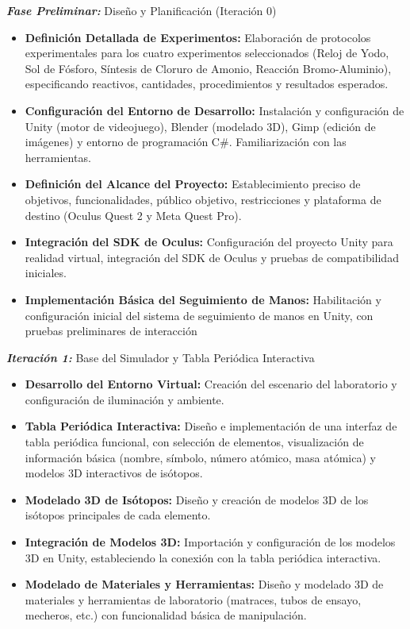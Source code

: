 \textit{\textbf{Fase Preliminar:}} Diseño y Planificación (Iteración 0)
\begin{itemize}
    \item \textbf{Definición Detallada de Experimentos:} Elaboración de protocolos experimentales para los cuatro experimentos seleccionados (Reloj de Yodo, Sol de Fósforo, Síntesis de Cloruro de Amonio, Reacción Bromo-Aluminio), especificando reactivos, cantidades, procedimientos y resultados esperados.
    \item \textbf{Configuración del Entorno de Desarrollo:} Instalación y configuración de Unity (motor de videojuego), Blender (modelado 3D), Gimp (edición de imágenes) y entorno de programación C\#. Familiarización con las herramientas.
    \item \textbf{Definición del Alcance del Proyecto:} Establecimiento preciso de objetivos, funcionalidades, público objetivo, restricciones y plataforma de destino (Oculus Quest 2 y Meta Quest Pro).
    \item \textbf{Integración del SDK de Oculus:} Configuración del proyecto Unity para realidad virtual, integración del SDK de Oculus y pruebas de compatibilidad iniciales.
    \item \textbf{Implementación Básica del Seguimiento de Manos:} Habilitación y configuración inicial del sistema de seguimiento de manos en Unity, con pruebas preliminares de interacción
\end{itemize}

\textit{\textbf{Iteración 1:}} Base del Simulador y Tabla Periódica Interactiva
\begin{itemize}
    \item\textbf{Desarrollo del Entorno Virtual:} Creación del escenario del laboratorio y configuración de iluminación y ambiente.
    \item\textbf{Tabla Periódica Interactiva:} Diseño e implementación de una interfaz de tabla periódica funcional, con selección de elementos, visualización de información básica (nombre, símbolo, número atómico, masa atómica) y modelos 3D interactivos de isótopos.
    \item\textbf{Modelado 3D de Isótopos:} Diseño y creación de modelos 3D de los isótopos principales de cada elemento.
    \item\textbf{Integración de Modelos 3D:} Importación y configuración de los modelos 3D en Unity, estableciendo la conexión con la tabla periódica interactiva.
    \item\textbf{Modelado de Materiales y Herramientas:} Diseño y modelado 3D de materiales y herramientas de laboratorio (matraces, tubos de ensayo, mecheros, etc.) con funcionalidad básica de manipulación.
\end{itemize}

